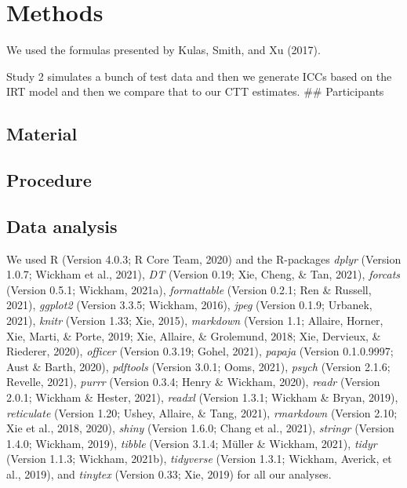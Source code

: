 \documentclass[
  english,
  man,floatsintext]{apa6}
\begin{document}
\hypertarget{methods}{%
\section{Methods}\label{methods}}

We used the formulas presented by Kulas, Smith, and Xu (2017).

Study 2 simulates a bunch of test data and then we generate ICCs based on the IRT model and then we compare that to our CTT estimates.
\#\# Participants

\hypertarget{material}{%
\subsection{Material}\label{material}}

\hypertarget{procedure}{%
\subsection{Procedure}\label{procedure}}

\hypertarget{data-analysis}{%
\subsection{Data analysis}\label{data-analysis}}

We used R (Version 4.0.3; R Core Team, 2020) and the R-packages \emph{dplyr} (Version 1.0.7; Wickham et al., 2021), \emph{DT} (Version 0.19; Xie, Cheng, \& Tan, 2021), \emph{forcats} (Version 0.5.1; Wickham, 2021a), \emph{formattable} (Version 0.2.1; Ren \& Russell, 2021), \emph{ggplot2} (Version 3.3.5; Wickham, 2016), \emph{jpeg} (Version 0.1.9; Urbanek, 2021), \emph{knitr} (Version 1.33; Xie, 2015), \emph{markdown} (Version 1.1; Allaire, Horner, Xie, Marti, \& Porte, 2019; Xie, Allaire, \& Grolemund, 2018; Xie, Dervieux, \& Riederer, 2020), \emph{officer} (Version 0.3.19; Gohel, 2021), \emph{papaja} (Version 0.1.0.9997; Aust \& Barth, 2020), \emph{pdftools} (Version 3.0.1; Ooms, 2021), \emph{psych} (Version 2.1.6; Revelle, 2021), \emph{purrr} (Version 0.3.4; Henry \& Wickham, 2020), \emph{readr} (Version 2.0.1; Wickham \& Hester, 2021), \emph{readxl} (Version 1.3.1; Wickham \& Bryan, 2019), \emph{reticulate} (Version 1.20; Ushey, Allaire, \& Tang, 2021), \emph{rmarkdown} (Version 2.10; Xie et al., 2018, 2020), \emph{shiny} (Version 1.6.0; Chang et al., 2021), \emph{stringr} (Version 1.4.0; Wickham, 2019), \emph{tibble} (Version 3.1.4; Müller \& Wickham, 2021), \emph{tidyr} (Version 1.1.3; Wickham, 2021b), \emph{tidyverse} (Version 1.3.1; Wickham, Averick, et al., 2019), and \emph{tinytex} (Version 0.33; Xie, 2019) for all our analyses.
\end{document}
